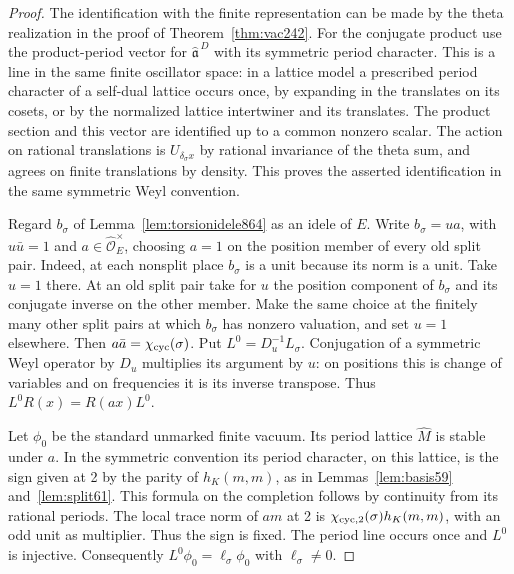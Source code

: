 \documentclass[a4paper,11pt]{article}
\theoremstyle{definition}
\theoremstyle{remark}
\numberwithin{equation}{section}
\begin{document}
\begin{proof}
The identification with the finite representation can be made by
the theta realization in the proof of Theorem~\ref{thm:vac242}.
For the conjugate product use the product-period vector for
\(\widehat{\mathfrak a}^{\,D}\) with its symmetric period
character. This is a line in the same finite oscillator space:
in a lattice model a prescribed period character of a self-dual
lattice occurs once, by expanding in the translates on its
cosets, or by the normalized lattice intertwiner and its
translates. The product section and this vector are identified
up to a common nonzero scalar. The action on rational translations
is \(U_{\delta_\sigma x}\) by rational invariance of the theta
sum, and agrees on finite translations by density. This proves
the asserted identification in the same symmetric Weyl convention.

Regard \(b_\sigma\) of Lemma~\ref{lem:torsionidele864} as an
idele of \(E\). Write \(b_\sigma=u a\), with \(u\bar u=1\)
and \(a\in\widehat{\mathcal O}_E^\times\), choosing \(a=1\)
on the position member of every old split pair. Indeed, at
each nonsplit place \(b_\sigma\) is a unit because its norm
is a unit. Take \(u=1\) there. At an old split pair take for
\(u\) the position component of \(b_\sigma\) and its conjugate
inverse on the other member. Make the same choice at the
finitely many other split pairs at which \(b_\sigma\) has
nonzero valuation, and set \(u=1\) elsewhere.
Then \(a\bar a=\chi_{\rm cyc}(\sigma)\).
Put \(L^0=D_u^{-1}L_\sigma\). Conjugation of a symmetric
Weyl operator by \(D_u\) multiplies its argument by \(u\):
on positions this is change of variables and on frequencies
it is its inverse transpose. Thus \(L^0R(x)=R(ax)L^0\).

Let \(\phi_0\) be the standard unmarked finite vacuum. Its
period lattice \(\widehat M\) is stable under \(a\). In the
symmetric convention its period character, on this lattice,
is the sign given at 2 by the parity of \(h_K(m,m)\), as in
Lemmas~\ref{lem:basis59} and~\ref{lem:split61}. This formula
on the completion follows by continuity from its rational
periods. The local trace norm of \(am\) at 2 is
\(\chi_{\rm cyc,2}(\sigma) h_K(m,m)\), with an odd unit as
multiplier. Thus the sign is fixed. The period line occurs
once and \(L^0\) is injective. Consequently
\(L^0\phi_0=\ell_\sigma\phi_0\) with \(\ell_\sigma\ne0\).


\end{proof}
\end{document}
